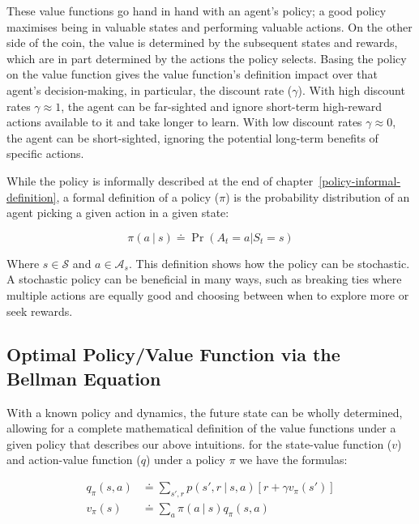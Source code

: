 \documentclass[]{final_report}
\begin{document}
These value functions go hand in hand with an agent's policy; a good policy maximises being in valuable states and performing valuable actions. On the other side of the coin, the value is determined by the subsequent states and rewards, which are in part determined by the actions the policy selects. Basing the policy on the value function gives the value function's definition impact over that agent's decision-making, in particular, the\label{discount-rate-introduction} discount rate ($\gamma$). With high discount rates $\gamma \approx 1$, the agent can be far-sighted and ignore short-term high-reward actions available to it and take longer to learn. With low discount rates $\gamma \approx 0$, the agent can be short-sighted, ignoring the potential long-term benefits of specific actions.

While the policy is informally described at the end of chapter~\ref{policy-informal-definition}, a formal definition of a policy ($\pi$) is the probability distribution of an agent picking a given action in a given state:

\begin{equation}
  \pi(a \ |\ s) \doteq \Pr(A_t = a | S_t = s)
  \label{eqn:policy-def}
\end{equation}



Where $s \in \mathcal{S}$ and $a \in \mathcal{A}_s$. This definition shows how the policy can be stochastic. A stochastic policy can be beneficial in many ways, such as breaking ties where multiple actions are equally good and choosing between when to explore more or seek rewards. 

\subsection{Optimal Policy/Value Function via the Bellman Equation}

With a known policy and dynamics, the future state can be wholly determined, allowing for a complete mathematical definition of the value functions under a given policy that describes our above intuitions. for the state-value function ($v$) and action-value function ($q$) under a policy $\pi$ we have the formulas:


\begin{align}
  q_\pi(s,a) & \doteq \sum_{s',r}p(s',r\ |\ s, a)[r + \gamma v_\pi(s')]\label{eqn:q-def} \\
  v_\pi(s)   & \doteq \sum_a \pi(a\ |\ s) q_\pi(s,a) \label{eqn:v-def}
\end{align}
\end{document}
